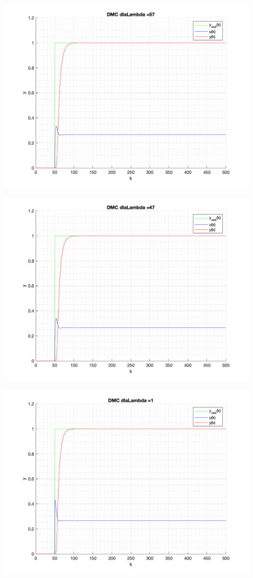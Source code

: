 \documentclass[a4paper, 11pt]{article}
\begin{document}
\begin{enumerate}
 \includegraphics[width=\linewidth]{./ModelsP4_Lambda/P4_DMC_Lambda_57_png.png} 
 
 \includegraphics[width=\linewidth]{./ModelsP4_Lambda/P4_DMC_Lambda_47_png.png} 
 
 \includegraphics[width=\linewidth]{./ModelsP4_Lambda/P4_DMC_Lambda_1_png.png} 
 

\end{enumerate}
\end{document}
